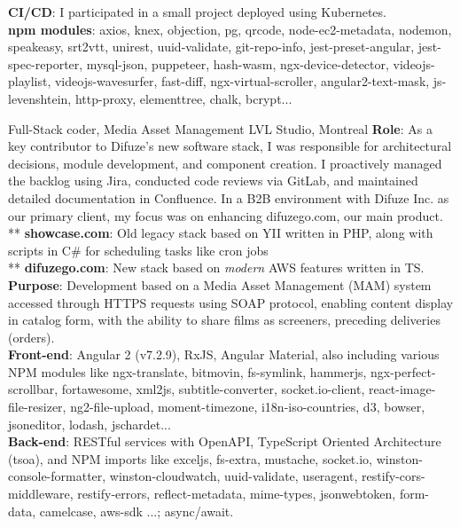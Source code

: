 \documentclass[
  a4paper,
   maincolor=cvblue,
   sectioncolor=cvblue,
]{fortysecondscv}
\begin{document}
\begin{cvtable}
{    \textbf{CI/CD}: I participated in a small project deployed using Kubernetes.\\
    \textbf {npm modules}: axios, knex, objection, pg, qrcode, node-ec2-metadata, nodemon, speakeasy, srt2vtt, unirest, uuid-validate, git-repo-info, jest-preset-angular, jest-spec-reporter, mysql-json, puppeteer, hash-wasm, ngx-device-detector, videojs-playlist, videojs-wavesurfer, fast-diff, ngx-virtual-scroller, angular2-text-mask, js-levenshtein, http-proxy, elementtree, chalk, bcrypt...
  }
\end{cvtable}


\begin{cvtable}
    {Full-Stack coder, Media Asset Management}
    {LVL Studio, Montreal}
    {
      \textbf{Role}: As a key contributor to Difuze’s new software stack, I was responsible for architectural decisions, module development, and component creation. I proactively managed the backlog using Jira, conducted code reviews via GitLab, and maintained detailed documentation in Confluence. In a B2B environment with Difuze Inc. as our primary client, my focus was on enhancing difuzego.com, our main product.\\
         ** \noindent\hspace*{1mm}\textbf{showcase.com}: Old legacy stack based on YII written in PHP, along with scripts in C\# for scheduling tasks like cron jobs\\
         ** \noindent\hspace*{1mm}\textbf{difuzego.com}: New stack based on \textit{modern} AWS features written in TS.\\
      \textbf{Purpose}: Development based on a Media Asset Management (MAM) system accessed through HTTPS requests using SOAP protocol, enabling content display in catalog form, with the ability to share films as screeners, preceding deliveries (orders).\\
      \textbf{Front-end}: Angular 2 (v7.2.9), RxJS, Angular Material, also including various NPM modules like ngx-translate, bitmovin, fs-symlink, hammerjs, ngx-perfect-scrollbar, fortawesome, xml2js, subtitle-converter, socket.io-client, react-image-file-resizer, ng2-file-upload, moment-timezone, i18n-iso-countries, d3, bowser, jsoneditor, lodash, jschardet...\\
      \textbf{Back-end}: RESTful services with OpenAPI, TypeScript Oriented Architecture (tsoa), and NPM imports like exceljs, fs-extra, mustache, socket.io, winston-console-formatter, winston-cloudwatch, uuid-validate, useragent, restify-cors-middleware, restify-errors, reflect-metadata, mime-types, jsonwebtoken, form-data, camelcase, aws-sdk ...; async/await.\\
}
\end{cvtable}
\end{document}
